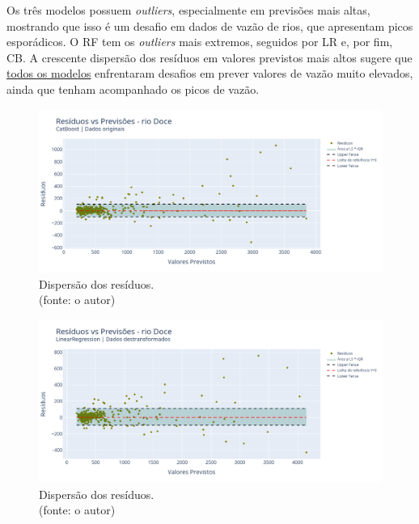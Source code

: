 Os três modelos possuem \textit{outliers}, especialmente em previsões mais altas, mostrando que isso é um desafio em dados de vazão de rios, que apresentam picos esporádicos. O RF tem os \textit{outliers} mais extremos, seguidos por LR e, por fim, CB. A crescente dispersão dos resíduos em valores previstos mais altos sugere que \underline{todos os modelos} enfrentaram desafios em prever valores de vazão muito elevados, ainda que tenham acompanhado os picos de vazão.

\begin{figure}[!h]
\centering
\includegraphics[scale=0.33]{Figuras/rio_doce/wfv/CB/CB_WFV_ORIG_RESID_x_PREV.png}
\caption{Dispersão dos resíduos.\\(fonte: o autor)}
\label{fig:doce_CB_WFV_ORIG_RESID_x_PREV}
\end{figure}

\begin{figure}[!h]
\centering
\includegraphics[scale=0.33]{Figuras/rio_doce/wfv/LR/LR_WFV_LOG_RESID_x_PREV.png}
\caption{Dispersão dos resíduos.\\(fonte: o autor)}
\label{fig:doce_LR_WFV_LOG_RESID_x_PREV}
\end{figure}

